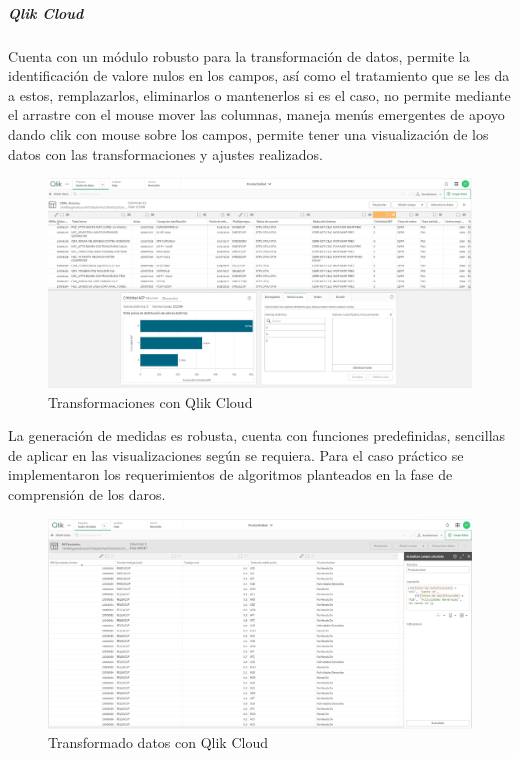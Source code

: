 \documentclass[
  11pt,
  bookmarksnumbered]{article}
\begin{document}
\hypertarget{qlik-cloud}{%
\subparagraph{Qlik Cloud}\label{qlik-cloud}}

Cuenta con un módulo robusto para la transformación de datos, permite la identificación de valore nulos en los campos, así como el tratamiento que se les da a estos, remplazarlos, eliminarlos o mantenerlos si es el caso, no permite mediante el arrastre con el mouse mover las columnas, maneja menús emergentes de apoyo dando clik con mouse sobre los campos, permite tener una visualización de los datos con las transformaciones y ajustes realizados.

\begin{figure}

{\centering \includegraphics[width=4.68in]{media 2/image11} 

}

\caption{Transformaciones con Qlik Cloud}\label{fig:unnamed-chunk-16}
\end{figure}

La generación de medidas es robusta, cuenta con funciones predefinidas, sencillas de aplicar en las visualizaciones según se requiera.
Para el caso práctico se implementaron los requerimientos de algoritmos planteados en la fase de comprensión de los daros.

\begin{figure}

{\centering \includegraphics[width=4.68in]{media 2/image12} 

}

\caption{Transformado datos con Qlik Cloud}\label{fig:unnamed-chunk-17}
\end{figure}
\end{document}
